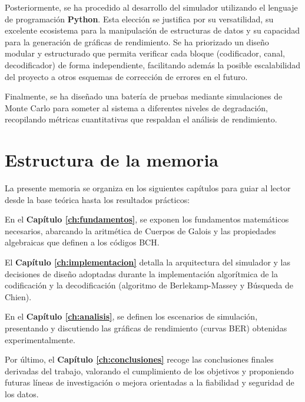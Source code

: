Posteriormente, se ha procedido al desarrollo del simulador utilizando el lenguaje de programación \textbf{Python}. Esta elección se justifica por su versatilidad, su excelente ecosistema para la manipulación de estructuras de datos y su capacidad para la generación de gráficas de rendimiento. Se ha priorizado un diseño modular y estructurado que permita verificar cada bloque (codificador, canal, decodificador) de forma independiente, facilitando además la posible escalabilidad del proyecto a otros esquemas de corrección de errores en el futuro.

Finalmente, se ha diseñado una batería de pruebas mediante simulaciones de Monte Carlo para someter al sistema a diferentes niveles de degradación, recopilando métricas cuantitativas que respaldan el análisis de rendimiento.

\section{Estructura de la memoria}

La presente memoria se organiza en los siguientes capítulos para guiar al lector desde la base teórica hasta los resultados prácticos:

En el \textbf{Capítulo \ref{ch:fundamentos}}, se exponen los fundamentos matemáticos necesarios, abarcando la aritmética de Cuerpos de Galois y las propiedades algebraicas que definen a los códigos BCH.

El \textbf{Capítulo \ref{ch:implementacion}} detalla la arquitectura del simulador y las decisiones de diseño adoptadas durante la implementación algorítmica de la codificación y la decodificación (algoritmo de Berlekamp-Massey y Búsqueda de Chien).

En el \textbf{Capítulo \ref{ch:analisis}}, se definen los escenarios de simulación, presentando y discutiendo las gráficas de rendimiento (curvas BER) obtenidas experimentalmente.

Por último, el \textbf{Capítulo \ref{ch:conclusiones}} recoge las conclusiones finales derivadas del trabajo, valorando el cumplimiento de los objetivos y proponiendo futuras líneas de investigación o mejora orientadas a la fiabilidad y seguridad de los datos.